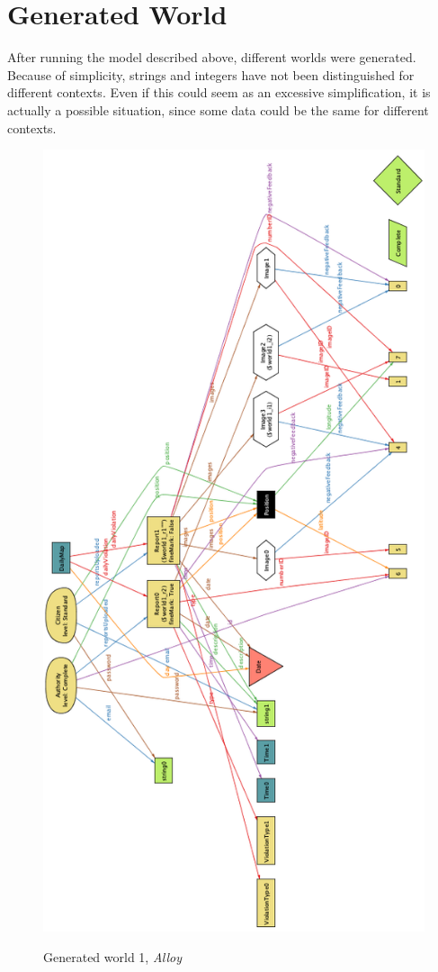 \documentclass[../RASD.tex]{subfiles}
\begin{document}
    \section{Generated World}\label{sec:generated-world}
    After running the model described above, different worlds were generated.
    Because of simplicity, strings and integers have not been distinguished for different contexts.
    Even if this could seem as an excessive simplification, it is actually a possible situation, since some data could be the same for different contexts.
    \begin{figure}[H]
        \centering
        \includegraphics[scale = 0.7]{assets/world1.png}\\
        \caption[Generated world 1, \textit{Alloy}]{Generated world 1, \textit{Alloy}}
    \end{figure}
\end{document}
